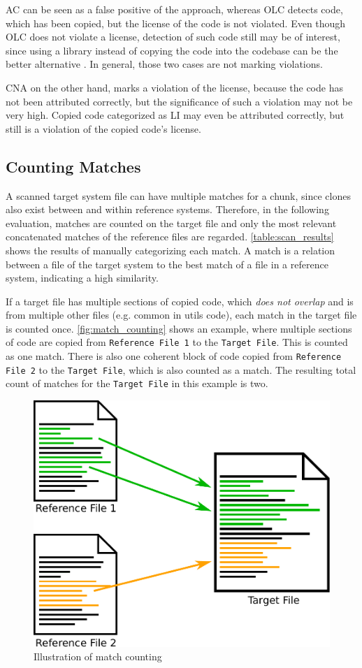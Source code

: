 AC can be seen as a false positive of the approach, whereas OLC detects code, which has been copied, but the license of the code is not violated.
Even though OLC does not violate a license, detection of such code still may be of interest, since using a library instead of copying the code into the codebase can be the better alternative \cite{heinemann2012effective}.
In general, those two cases are not marking violations.

CNA on the other hand, marks a violation of the license, because the code has not been attributed correctly, but the significance of such a violation may not be very high.
Copied code categorized as LI may even be attributed correctly, but still is a violation of the copied code's license.

\subsection{Counting Matches}
A scanned target system file can have multiple matches for a chunk, since clones also exist between and within reference systems.
Therefore, in the following evaluation, matches are counted on the target file and only the most relevant concatenated matches of the reference files are regarded.
\autoref{table:scan_results} shows the results of manually categorizing each match.
A match is a relation between a file of the target system to the best match of a file in a reference system, indicating a high similarity.

If a target file has multiple sections of copied code, which \textit{does not overlap} and is from multiple other files (e.g. common in utils code), each match in the target file is counted once.
\autoref{fig:match_counting} shows an example, where multiple sections of code are copied from \texttt{Reference File 1} to the \texttt{Target File}.
This is counted as one match.
There is also one coherent block of code copied from \texttt{Reference File 2} to the \texttt{Target File}, which is also counted as a match.
The resulting total count of matches for the \texttt{Target File} in this example is two.

\begin{figure}[h]
	\centering
	\includegraphics[width=0.7\linewidth]{figures/match_counting.pdf}
	\caption{Illustration of match counting}\label{fig:match_counting}
\end{figure}

